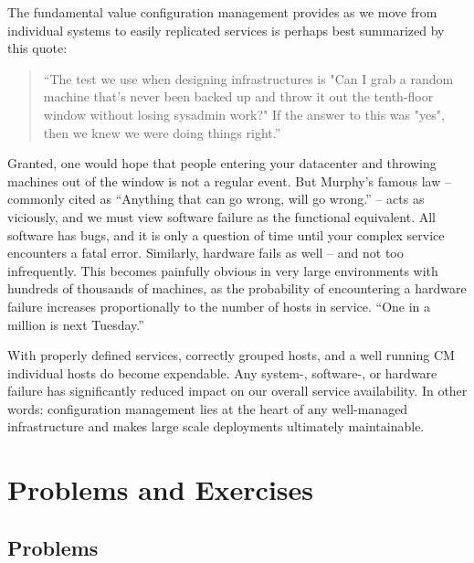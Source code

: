 The fundamental value configuration management provides as
we move from individual systems to easily replicated
services is perhaps best summarized by this quote:

\begin{quote}
``The test we use when designing infrastructures is "Can I grab a random
machine that's never been backed up and throw it out the tenth-floor
window without losing sysadmin work?" If the answer to this was "yes",
then we knew we were doing things
right.''\cite{configuration-management:traugott}
\end{quote}

Granted, one would hope that people entering your
datacenter and throwing machines out of the window is
not a regular event.  But Murphy's famous
law -- commonly cited as ``Anything
that can go wrong, will go wrong.'' -- acts as
viciously, and we must view software failure as the
functional equivalent.  All software has bugs, and it
is only a question of time until your complex service
encounters a fatal error.  Similarly, hardware fails
as well -- and not too infrequently.  This becomes
painfully obvious in very large environments with
hundreds of thousands of machines, as the probability
of encountering a hardware failure increases
proportionally to the number of hosts in service.
``One in a million is next
Tuesday.''\cite{configuration-management:next-tuesday}

With properly defined services, correctly grouped
hosts, and a well running CM individual hosts do
become expendable.  Any system-, software-, or
hardware failure has significantly reduced impact on
our overall service availability.  In other words:
configuration management lies at the heart of any
well-managed infrastructure and makes large scale
deployments ultimately maintainable.

\vfill
\pagebreak

\chapter*{Problems and Exercises}
\section*{Problems}


